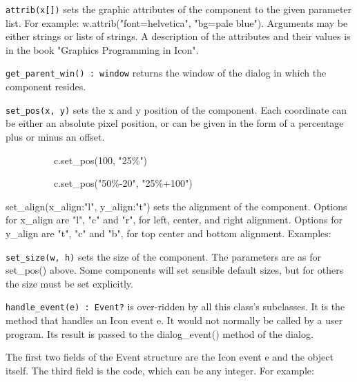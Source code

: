 \texttt{attrib(x[])} sets the graphic attributes of the component to the given
parameter list. For example:
w.attrib("font=helvetica",
"bg=pale blue"). Arguments may be either
strings or lists of strings. A description of the attributes and their
values is in the book "Graphics Programming in Icon".

\texttt{get\_parent\_win() : window} returns the window of the dialog in which
the component resides.

\texttt{set\_pos(x, y)} sets the x and y position of the component. Each
coordinate can be either an absolute pixel position, or can be given in
the form of a percentage plus or minus an offset.

{\ttfamily
\ \ \ \ \ \ \ \ \ \ c.set\_pos(100, "25\%")}

{\ttfamily
\ \ \ \ \ \ \ \ \ \ c.set\_pos("50\%-20",
"25\%+100")}

set\_align(x\_align:"l",
y\_align:"t") sets the alignment of the
component. Options for x\_align are "l",
"c" and "r",
for left, center, and right alignment. Options for y\_align are
"t", "c" and
"b", for top center and bottom alignment.
Examples:


\texttt{set\_size(w, h)} sets the size of the component. The parameters are as
for set\_pos() above. Some components will set sensible default sizes,
but for others the size must be set explicitly.

\texttt{handle\_event(e) : Event?} is over-ridden by all this
class's subclasses. It is the method that handles an
Icon event e. It would not normally be called by a user program. Its
result is passed to the dialog\_event() method of the dialog.

The first two fields of the Event structure are the Icon event e and the
object itself. The third field is the code, which can be any integer.
For example:


